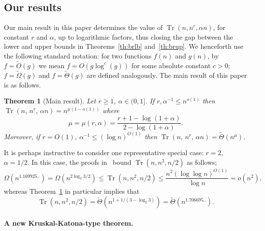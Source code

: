 \documentclass[11pt]{article}
\newtheorem{theo}{Theorem}[section]
\renewcommand{\a}{\alpha}
\newcommand{\C}{\mu}
\DeclareMathOperator{\trace}{Tr}
\begin{document}

\subsection{Our results}
Our main result in this paper determines the value of $\trace(n,n^r,\a n)$, for constant $r$ and $\a$, up to logarithmic
factors, thus closing the gap between the lower and upper bounds in Theorems~\ref{th:brlb} and~\ref{th:brup}. 
We henceforth use the following standard notation: for two functions $f(n)$ and $g(n)$, by $f=\tilde{O}(g)$ we mean
$f = O(g\log^c(g))$ for some absolute constant $c>0$;
$f=\tilde{\Omega}(g)$ and
$f=\tilde{\Theta}(g)$ are defined analogously. 
The main result of this paper is as follows.
\begin{theo}[Main result]\label{t12}
	Let $r \ge 1$, $\a \in (0,1]$. If $r, \a^{-1} \le n^{o(1)}$ then %
	$\trace(n,\,n^r,\,\a n) = n^{\C(1-o(1))}$
	where
	\begin{equation}\label{eq:C}
	\C=\C(r,\a)=\frac{r+1-\log(1+\a)}{2-\log(1+\a)}.
	\end{equation}
	Moreover, if $r=O(1)$, $\a^{-1} \le (\log n)^{O(1)}$ then $\trace(n,\,n^r,\,\a n) = \tilde{\Theta}(n^{\C})$.
\end{theo}

It is perhaps instructive to consider one representative special 
case: $r=2$, $\a = 1/2$. 
In this case, 
the proofs in~\cite{BR} 
bound $\trace(n,n^2,n/2)$ as follows;
$$
\Omega(n^{1.169925..}) =
\Omega(n^{2 \log_2 {3/2}}) \leq \trace(n,n^2,n/2) 
\le \frac{n^2 (\log \log n)^{O(1)}}{\log n} = o(n^2),
$$
whereas Theorem~\ref{t12} in particular implies that
$$\trace(n,n^2,n/2)=\tilde{\Theta}(n^{1+1/(3-\log_2 3)})
=\tilde{\Theta}(n^{1.706695..}).
$$

\paragraph{A new Kruskal-Katona-type theorem.}
\end{document}
